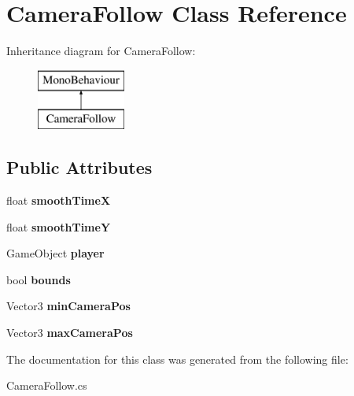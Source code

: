 \hypertarget{class_camera_follow}{}\section{Camera\+Follow Class Reference}
\label{class_camera_follow}
Inheritance diagram for Camera\+Follow\+:\begin{figure}[H]
\begin{center}
\leavevmode
\includegraphics[height=2.000000cm]{class_camera_follow}
\end{center}
\end{figure}
\subsection*{Public Attributes}
\begin{DoxyCompactItemize}
\item 
\hypertarget{class_camera_follow_a81fee88b02e94df331b3f9d2c7cf03b2}{}\label{class_camera_follow_a81fee88b02e94df331b3f9d2c7cf03b2} 
float {\bfseries smooth\+TimeX}
\item 
\hypertarget{class_camera_follow_accdac5d0679acf98fa098f5a8fd7105f}{}\label{class_camera_follow_accdac5d0679acf98fa098f5a8fd7105f} 
float {\bfseries smooth\+TimeY}
\item 
\hypertarget{class_camera_follow_a9d816384fddcc790114d16e5886e051c}{}\label{class_camera_follow_a9d816384fddcc790114d16e5886e051c} 
Game\+Object {\bfseries player}
\item 
\hypertarget{class_camera_follow_add6d71fd83ea10f24ef56ca80e853e9a}{}\label{class_camera_follow_add6d71fd83ea10f24ef56ca80e853e9a} 
bool {\bfseries bounds}
\item 
\hypertarget{class_camera_follow_a0d9dc7c6572cfeffd957e8e63b62969c}{}\label{class_camera_follow_a0d9dc7c6572cfeffd957e8e63b62969c} 
Vector3 {\bfseries min\+Camera\+Pos}
\item 
\hypertarget{class_camera_follow_a6fc27efa09010828e8016e5df83a3c01}{}\label{class_camera_follow_a6fc27efa09010828e8016e5df83a3c01} 
Vector3 {\bfseries max\+Camera\+Pos}
\end{DoxyCompactItemize}


The documentation for this class was generated from the following file\+:\begin{DoxyCompactItemize}
\item 
Camera\+Follow.\+cs\end{DoxyCompactItemize}

